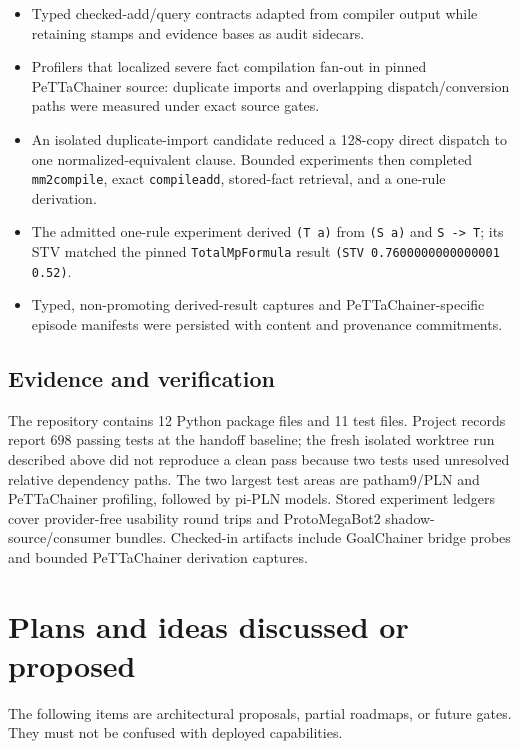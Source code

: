 \documentclass[11pt]{article}
\begin{document}
\begin{itemize}
\item Typed checked-add/query contracts adapted from compiler output while
retaining stamps and evidence bases as audit sidecars.
\item Profilers that localized severe fact compilation fan-out in pinned
PeTTaChainer source: duplicate imports and overlapping dispatch/conversion
paths were measured under exact source gates.
\item An isolated duplicate-import candidate reduced a 128-copy direct
dispatch to one normalized-equivalent clause.  Bounded experiments then
completed \texttt{mm2compile}, exact \texttt{compileadd}, stored-fact retrieval,
and a one-rule derivation.
\item The admitted one-rule experiment derived \texttt{(T a)} from
\texttt{(S a)} and \texttt{S -> T}; its STV matched the pinned
\texttt{TotalMpFormula} result \texttt{(STV 0.7600000000000001 0.52)}.
\item Typed, non-promoting derived-result captures and PeTTaChainer-specific
episode manifests were persisted with content and provenance commitments.
\end{itemize}

\subsection{Evidence and verification}

The repository contains 12 Python package files and 11 test files.  Project
records report 698 passing tests at the handoff baseline; the fresh isolated
worktree run described above did not reproduce a clean pass because two tests
used unresolved relative dependency paths.  The two largest
test areas are patham9/PLN and PeTTaChainer profiling, followed by pi-PLN models.
Stored experiment ledgers cover provider-free usability round trips and
ProtoMegaBot2 shadow-source/consumer bundles.  Checked-in artifacts include
GoalChainer bridge probes and bounded PeTTaChainer derivation captures.

\section{Plans and ideas discussed or proposed}

The following items are architectural proposals, partial roadmaps, or future
gates.  They must not be confused with deployed capabilities.
\end{document}
